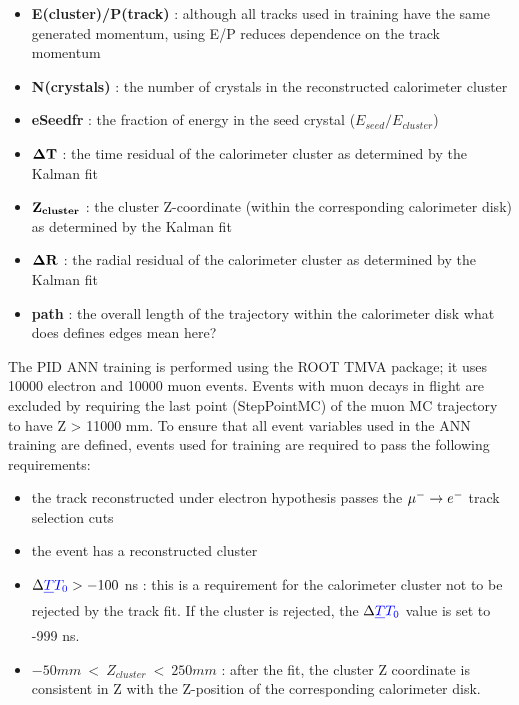 \begin{itemize}
\item 
  {\bf E(cluster)/P(track)} : although all tracks used in training have the same generated momentum,
  using E/P reduces dependence on the track momentum 
\item 
  {\bf N(crystals)} : {\blue the} number of crystals in the reconstructed calorimeter cluster
\item 
  {\bf eSeedfr} : {\blue the} fraction of energy in the seed crystal ($E_{seed}/E_{cluster}$)
\item 
  {$\bf \Delta T$} : {\blue the} time residual of the calorimeter cluster as determined by the {\blue K}alman fit
\item 
  {$\bf Z_{cluster}$} : {\blue the} cluster Z-coordinate (within the corresponding calorimeter disk) as determined by the {\blue K}alman fit
\item 
  {$\bf \Delta R$} : {\blue the} radial residual of the calorimeter cluster as determined by the {\blue K}alman fit
\item 
  {\bf path} : {\blue the} overall length of the trajectory within the calorimeter disk {\blue what does defines edges mean here?}
\end{itemize}

{\blue The} PID ANN training {\blue is} performed using {\blue the} ROOT TMVA package{\blue ; it} uses 10000 electron and 10000 muon events.
Events with muon decays in flight are excluded by requiring the last point (StepPointMC)
of the muon MC trajectory to have Z > 11000 mm.
%
To ensure that all event variables used in the ANN training are defined, events used for training
are required to pass the following requirements:

\begin{itemize}
\item 
  {\blue the track} reconstructed under electron hypothesis  passes the {\blue $\mbox{$\mu^- \rightarrow e^-$}$} track selection cuts
\item 
   {\blue the} event has a reconstructed cluster 
\item 
  $\Delta \strike{T} {\blue T_0} > -100$ {\blue ns} : this is a requirement for the calorimeter cluster not to be rejected by the track fit.
   {\blue If} the cluster is rejected, the $\Delta \strike{T} {\blue T_0}$ value {\blue is} set to -999 {\blue ns}.
\item
  $-50 mm ~<~ Z_{cluster} ~<~ 250 mm$ : after the fit, the cluster Z coordinate is consistent in Z with the
  Z-position of the corresponding calorimeter disk.
\end{itemize}

